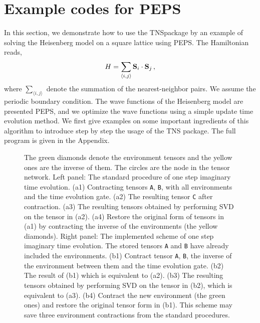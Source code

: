 \documentclass[preprint,3p,times,preprint,showpacs,amsmath,superscriptaddress,floatfix]{elsarticle}
\begin{document}
\section{Example codes for PEPS}
\label{sec:examples}

In this section, we demonstrate how to use the TNSpackage by an example of solving the Heisenberg model on
a square lattice using PEPS. The Hamiltonian reads,
%
\begin{equation}
H=\sum_{\langle i,j\rangle} {\bf S}_i \cdot {\bf S}_j \, ,
\end{equation}
where $\sum_{\langle i,j\rangle}$ denote the summation of the nearest-neighbor pairs. We assume the periodic boundary condition.
The wave functions of the Heisenberg model are presented PEPS, and we optimize the wave functions using a simple update time evolution method\cite{Xiang2008}.
We first give examples on some important ingredients of this algorithm to introduce step by step
the usage of the TNS package. The full program is given in the Appendix.


\begin{figure} [!hbp]
		\begin{center}
		\caption{The green diamonds denote the environment tensors and the yellow ones are the inverse of them.
The circles are the node in the tensor network. Left panel: The standard procedure of one step imaginary time evolution.
(a1) Contracting tensors {\tt A}, {\tt B}, with all environments and the time
evolution gate. (a2) The resulting tensor {\tt C} after contraction.
(a3) The resulting tensors obtained by performing SVD on the tensor in (a2). (a4) Restore the original form of tensors in (a1) by
contracting the inverse of the environments (the yellow diamonds).  Right panel: The implemented scheme of one step imaginary time evolution.
The stored tensors {\tt A} and {\tt B} have already included the environments. (b1)
Contract tensor {\tt A}, {\tt B}, the inverse of the environment between them and the time evolution gate.
(b2) The result of (b1) which is equivalent to (a2). (b3) The resulting tensors obtained by performing SVD on the tensor in (b2), which
is equivalent to (a3). (b4) Contract the  new environment (the green ones)
and restore the original tensor form in (b1).
This scheme may save three environment contractions from the standard procedures.}\label{fig::evo}
		\end{center}
\end{figure}
\end{document}
